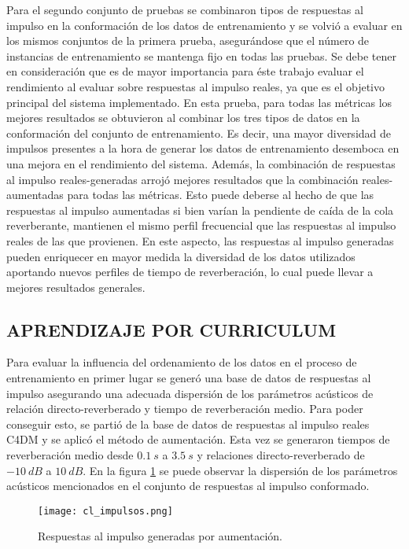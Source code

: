 Para el segundo conjunto de pruebas se combinaron tipos de respuestas al impulso en la conformación de los datos de entrenamiento y se volvió a evaluar en los mismos conjuntos de la primera prueba, asegurándose que el número de instancias de entrenamiento se mantenga fijo en todas las pruebas. Se debe tener en consideración que es de mayor importancia para éste trabajo evaluar el rendimiento al evaluar sobre respuestas al impulso reales, ya que es el objetivo principal del sistema implementado. En esta prueba, para todas las métricas los mejores resultados se obtuvieron al combinar los tres tipos de datos en la conformación del conjunto de entrenamiento. Es decir, una mayor diversidad de impulsos presentes a la hora de generar los datos de entrenamiento desemboca en una mejora en el rendimiento del sistema. Además, la combinación de respuestas al impulso reales-generadas arrojó mejores resultados que la combinación reales-aumentadas para todas las métricas. Esto puede deberse al hecho de que las respuestas al impulso aumentadas si bien varían la pendiente de caída de la cola reverberante, mantienen el mismo perfil frecuencial que las respuestas al impulso reales de las que provienen. En este aspecto, las respuestas al impulso generadas pueden enriquecer en mayor medida la diversidad de los datos utilizados aportando nuevos perfiles de tiempo de reverberación, lo cual puede llevar a mejores resultados generales. 


\subsection[Aprendizaje por curriculum]{APRENDIZAJE POR CURRICULUM}
Para evaluar la influencia del ordenamiento de los datos en el proceso de entrenamiento en primer lugar se generó una base de datos de respuestas al impulso asegurando una adecuada dispersión de los parámetros acústicos de relación directo-reverberado y tiempo de reverberación medio. Para poder conseguir esto, se partió de la base de datos de respuestas al impulso reales C4DM y se aplicó el método de aumentación. Esta vez se generaron tiempos de reverberación medio desde $0.1 \ s$ a $3.5 \ s$ y relaciones directo-reverberado de $-10 \ dB$ a $10 \ dB$. En la figura \ref{fig:cl_impulsos} se puede observar la dispersión de los parámetros acústicos mencionados en el conjunto de respuestas al impulso conformado.

\begin{figure}[H]
	\centering{}
	\texttt{[image: cl\_impulsos.png]}
	\caption{Respuestas al impulso generadas por aumentación.}
	\label{fig:cl_impulsos}
\end{figure}

